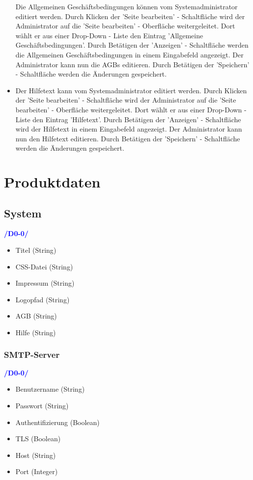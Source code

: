 \documentclass[a4paper]{scrreprt}
\newcounter{Lc}
\newcounter{Hc}
\newcommand{\resetAllCounter}{\setcounter{Lc}{0}\setcounter{Hc}{1}}
\begin{document}
\begin{itemize}
				    Die Allgemeinen Geschäftsbedingungen können vom Systemadministrator editiert werden. Durch Klicken der 'Seite bearbeiten' - Schaltfläche wird der Administrator auf die 'Seite bearbeiten' - Oberfläche weitergeleitet. Dort wählt er aus einer Drop-Down - Liste den Eintrag 'Allgemeine Geschäftsbedingungen'. Durch Betätigen der 'Anzeigen' - Schaltfläche werden die Allgemeinen Geschäftsbedingungen in einem Eingabefeld angezeigt. Der Administrator kann nun die AGBs editieren. Durch Betätigen der 'Speichern' - Schaltfläche werden die Änderungen gespeichert.  
			   	\item {}
				    Der Hilfetext kann vom Systemadministrator editiert werden. Durch Klicken der 'Seite bearbeiten' - Schaltfläche wird der Administrator auf die 'Seite bearbeiten' - Oberfläche weitergeleitet. Dort wählt er aus einer Drop-Down - Liste den Eintrag 'Hilfetext'. Durch Betätigen der 'Anzeigen' - Schaltfläche wird der Hilfetext in einem Eingabefeld angezeigt. Der Administrator kann nun den Hilfetext editieren. Durch Betätigen der 'Speichern' - Schaltfläche werden die Änderungen gespeichert. 
			\end{itemize}
		
\resetAllCounter
\renewcommand{\Func}[1]{\stepcounter{Lc}\textcolor{Blue}{\textbf{/D\arabic{Hc}0-\arabic{Lc}0/} #1} \\}	

\chapter{Produktdaten}
 \label{Produktdaten}
        
	
    \section{System}
	     \Func {} 
	     \begin{itemize}
	     	\item Titel (\gls{String})
	     	\item CSS-Datei (String)
	     	\item Impressum (String)
	     	\item Logopfad (String)
	     	\item AGB (String)
	     	\item Hilfe (String)
	     \end{itemize}
	    
	    
	    \subsection{SMTP-Server}
		    \Func {}
		    \begin{itemize}
		    	\item Benutzername (String)
		    	\item Passwort (String)
		    	\item Authentifizierung (\gls{Boolean})
		    	\item TLS (Boolean)
		    	\item Host (String)
		    	\item Port (\gls{Integer})
		    \end{itemize}
	    
\end{document}
